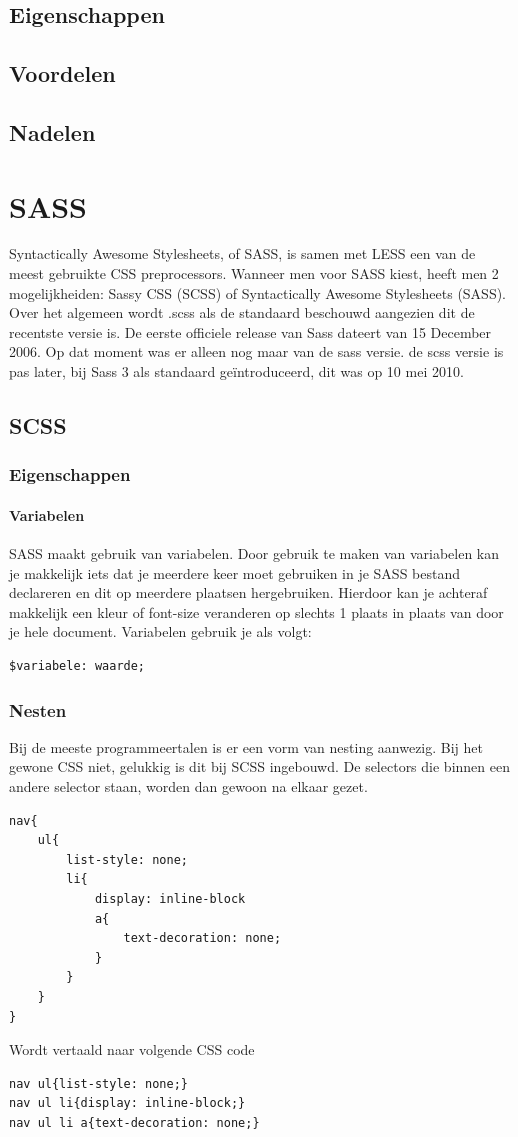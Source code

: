 \documentclass[pdftex,a4paper,12pt,twoside]{report}
\begin{document}
\subsection{Eigenschappen}
\subsection{Voordelen}
\subsection{Nadelen}


\section{SASS}
Syntactically Awesome Stylesheets, of SASS, is samen met LESS een van de meest gebruikte CSS preprocessors. Wanneer men voor SASS  kiest, heeft men 2 mogelijkheiden: Sassy CSS (SCSS) of Syntactically Awesome Stylesheets (SASS).\newline
Over het algemeen wordt .scss als de standaard beschouwd aangezien dit de recentste versie is. De eerste officiele release van Sass dateert van 15 December 2006. Op dat moment was er alleen nog maar van de sass versie. de scss versie is pas later, bij Sass 3 als standaard geïntroduceerd, dit was op 10 mei 2010. 
\subsection{SCSS}
\subsubsection{Eigenschappen}
\paragraph{Variabelen}
SASS maakt gebruik van variabelen. Door gebruik te maken van variabelen kan je makkelijk iets dat je meerdere keer moet gebruiken in je SASS bestand declareren en dit op meerdere plaatsen hergebruiken. Hierdoor kan je achteraf makkelijk een kleur of font-size veranderen op slechts 1 plaats in plaats van door je hele document.\newline
Variabelen gebruik je als volgt:
\begin{lstlisting}
$variabele: waarde;
\end{lstlisting}
\subsubsection{Nesten}
Bij de meeste programmeertalen is er een vorm van nesting aanwezig. Bij het gewone CSS niet, gelukkig is dit bij SCSS ingebouwd.
De selectors die binnen een andere selector staan, worden dan gewoon na elkaar gezet.
\begin{lstlisting}
nav{
	ul{
		list-style: none;
		li{
			display: inline-block
			a{
				text-decoration: none;			
			}
		}
	}
}
\end{lstlisting}
Wordt vertaald naar volgende CSS code
\begin{lstlisting}
nav ul{list-style: none;}
nav ul li{display: inline-block;}
nav ul li a{text-decoration: none;}
\end{lstlisting}
\end{document}
